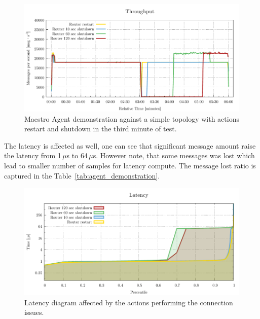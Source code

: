 \begin{figure}[H]
	\centering
	\includegraphics[width=1\linewidth]{obrazky-figures/charts/agent-throughput.pdf}
	\caption{Maestro Agent demonstration against a simple topology with actions restart and shutdown in the third minute of test.}
	\label{fig:agent-throughput}
\end{figure}

The latency is affected as well, one can see that significant message amount raise the latency from 1\,$\mu$s to 64\,$\mu$s. However note, that some messages was lost which lead to smaller number of samples for latency compute. The message lost ratio is captured in the Table~\ref{tab:agent_demonstration}.

\begin{figure}[H]
	\centering
	\includegraphics[width=1\linewidth]{obrazky-figures/charts/agent-latency.pdf}
	\caption{Latency diagram affected by the actions performing the connection issues.}
	\label{fig:agent-latency}
\end{figure}

